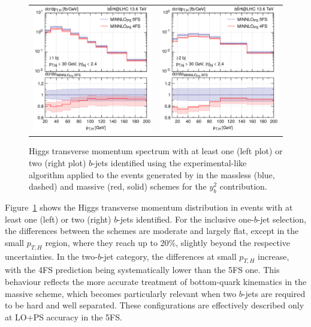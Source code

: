 \documentclass[11pt,a4paper]{article}
\begin{document}
\begin{figure}[t!]
\begin{center}
\begin{tabular}{cc}
\includegraphics[width=.45\textwidth, page=1]{plots/4fs/pt_H-EXP-1bjet.pdf}&
\includegraphics[width=.45\textwidth, page=1]{plots/4fs/pt_H-EXP-2bjet.pdf}
\end{tabular}
\vspace*{1ex}
\caption{Higgs transverse momentum spectrum with at least one (left plot) or two (right plot) $b$-jets identified using the experimental-like algorithm applied to the events generated by \minnlo{} in the massless (blue, dashed) and massive (red, solid) schemes for the $y_b^2$ contribution.\label{fig:4fsB}}
\end{center}
\end{figure}
 
Figure~\ref{fig:4fsB} shows the Higgs transverse momentum distribution in events with at least one (left) or two (right) $b$-jets identified. For the inclusive one-$b$-jet selection, the differences between the schemes are moderate and largely flat, except in the small $p_{T,H}$ region, where they reach up to 20\%, slightly beyond the respective uncertainties. 
In the two-$b$-jet category, the differences at small $p_{T,H}$ increase, with the 4FS prediction being systematically lower than the 5FS one. This behaviour reflects the more accurate treatment of bottom-quark kinematics in the massive scheme, which becomes particularly relevant when two $b$-jets are required to be hard and well separated. These configurations
are effectively described only at LO+PS accuracy in the 5FS.
\end{document}
